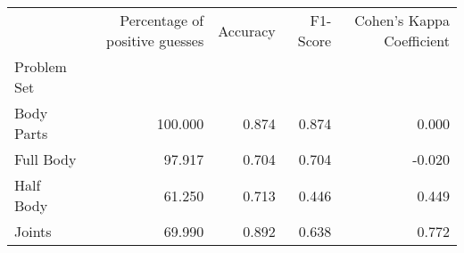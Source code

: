 \begin{table}
      \caption[]{}
      \label{}
      \begin{tabular}{lrrrr}
\hline
{} &  Percentage of positive guesses &  Accuracy &  F1-Score &  Cohen's Kappa Coefficient \\
Problem Set   &                                 &           &           &                            \\
\hline
Body Parts &                         100.000 &     0.874 &     0.874 &                      0.000 \\
Full Body  &                          97.917 &     0.704 &     0.704 &                     -0.020 \\
Half Body  &                          61.250 &     0.713 &     0.446 &                      0.449 \\
Joints     &                          69.990 &     0.892 &     0.638 &                      0.772 \\
\hline
\end{tabular}
\end{table}
